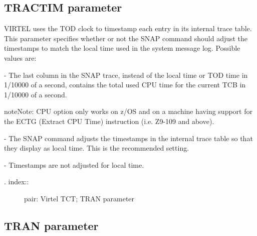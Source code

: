 \documentclass[letterpaper,10pt,english]{sphinxmanual}
\begin{document}
\subsection{TRACTIM parameter}
\label{\detokenize{Installation_Guide:tractim-parameter}}
\begin{sphinxVerbatim}[commandchars=\\\{\}]
 
\end{sphinxVerbatim}

VIRTEL uses the TOD clock to timestamp each entry in its internal trace table. This parameter specifies whether or not the SNAP command should adjust the timestamps to match the local time used in the system message log. Possible values are:

 - The last column in the SNAP trace, instead of the local time or TOD time in 1/10000 of a second, contains the total used CPU time for the current TCB in 1/10000 of a second.

\begin{sphinxadmonition}{note}{Note:}
CPU option only works on z/OS and on a machine having support for the ECTG (Extract CPU Time) instruction (i.e. Z9-109 and above).
\end{sphinxadmonition}

 - The SNAP command adjusts the timestamps in the internal trace table so that they display as local time. This is the recommended setting.

 - Timestamps are not adjusted for local time.
\begin{description}
\item[{. index::}] \leavevmode
pair: Virtel TCT; TRAN parameter

\end{description}


\subsection{TRAN parameter}
\label{\detokenize{Installation_Guide:tran-parameter}}
\begin{sphinxVerbatim}[commandchars=\\\{\}]
 
\end{sphinxVerbatim}
\end{document}
